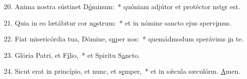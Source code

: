 20. Anima nostra sústinet D\uline{ó}minum:~* quóniam adjútor et protéctor nst\uline{e}r est.\par 
21. Quia in eo lætábitur cor n\uline{o}strum:~* et in nómine sancto ejus sperv\uline{i}mus.\par 
22. Fiat misericórdia tua, Dómine, s\uline{u}per nos:~* quemádmodum sperávims \uline{i}n te.\par 
23. Glória Patri, et F\uline{í}lio,~* et Spirítu S\uline{a}ncto.\par 
24. Sicut erat in princípio, et nunc, et s\uline{e}mper,~* et in sǽcula sæculórm. \uline{A}men.\par 
